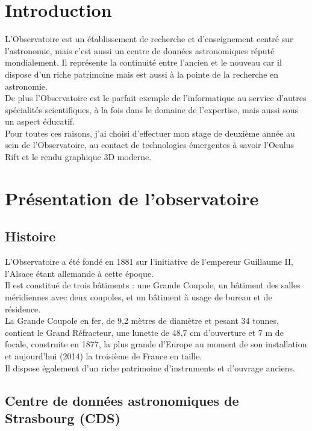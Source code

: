 \documentclass[a4paper,french,12pt]{article}
\begin{document}
\tableofcontents
\listoffigures

\newpage

\section{Introduction}

	L'Observatoire est un établissement de recherche et d'enseignement centré sur l'astronomie, mais c'est aussi un 
	centre de données astronomiques réputé mondialement. Il représente la continuité entre
	l'ancien et le nouveau car il dispose d'un riche patrimoine mais est aussi à la pointe de la recherche en astronomie.  \\
	De plus l'Observatoire est le parfait exemple de l'informatique au service d'autres spécialités scientifiques,
	à la fois dans le domaine de l'expertise, mais aussi sous un aspect éducatif.\\
	Pour toutes ces raisons, j'ai choisi d'effectuer mon stage de deuxième année au sein de l'Observatoire,
	au contact de technologies émergentes à savoir l'Oculus Rift et le rendu graphique 3D moderne.

\section{Présentation de l'observatoire}

	\subsection{Histoire}
		L'Observatoire a été fondé en 1881 sur l'initiative de l'empereur Guillaume II, l'Alsace étant allemande
		à cette époque.\\
		Il est constitué de trois bâtiments : une Grande Coupole, un bâtiment des salles méridiennes avec deux coupoles,
		et un bâtiment à usage de bureau et de résidence.\\
		La Grande Coupole en fer, de 9,2 mètres de diamètre et pesant 34 tonnes, contient le Grand Réfracteur,
		une lunette de 48,7 cm d'ouverture et 7 m de focale, construite en 1877, la plus grande d'Europe
		au moment de son installation et aujourd'hui (2014) la troisième de France en taille.\\
		Il dispose également d’un riche patrimoine d’instruments et d’ouvrage anciens.
		
	\subsection{Centre de données astronomiques de Strasbourg (CDS)}
	
\end{document}
